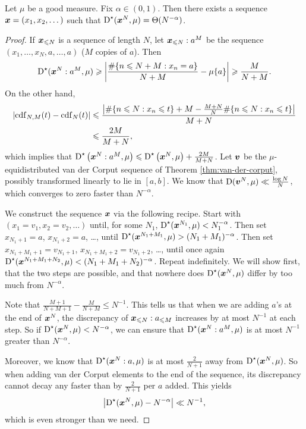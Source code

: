 \begin{theorem}\label{thm:discrepancy-arbitrary}
Let $\mu$ be a good measure. Fix $\alpha\in (0,1)$. Then there exists a 
sequence ${\boldsymbol x}=(x_1,x_2,\dots)$ such that 
$\operatorname{D}^\star({\boldsymbol x}^N,\mu) = \Theta(N^{-\alpha})$. 
\end{theorem}
\begin{proof}
If ${\boldsymbol x}_{\leqslant N}$ is a sequence of length $N$, let 
${\boldsymbol x}_{\leqslant N}:a^M$ be the sequence $(x_1,\dots,x_N,a,\dots,a)$ ($M$ copies 
of $a$). Then 
\[
	\operatorname{D}^\star({\boldsymbol x}^N:a^M,\mu)
		\geqslant \left| \frac{\#\{ n\leqslant N+M : x_n = a\}}{N+M} - \mu\{a\}\right| 
		\geqslant \frac{M}{N+M} .
\]
On the other hand, 
\begin{align*}
	\left| \operatorname{cdf}_{N,M}(t) - \operatorname{cdf}_N(t)\right| 
		&\leqslant \frac{\left|\#\{n\leqslant N : x_n\leqslant t\} + M - \frac{M+N}{N}\#\{n\leqslant N : x_n\leqslant t\}\right|}{M+N} \\
		&\leqslant \frac{2M}{M+N} ,
\end{align*}
which implies that 
$\operatorname{D}^\star\left({\boldsymbol x}^N:a^M,\mu\right) \leqslant \operatorname{D}^\star\left({\boldsymbol x}^N,\mu\right) + \frac{2 M}{M+N}$. 
Let ${\boldsymbol v}$ be the $\mu$-equidistributed van der Corput sequence of 
Theorem \ref{thm:van-der-corput}, possibly transformed linearly to lie in 
$[a,b]$. We know that $\operatorname{D}({\boldsymbol v}^N, \mu) \ll \frac{\log N}{N}$, which converges 
to zero faster than $N^{-\alpha}$. 

We construct the sequence ${\boldsymbol x}$ via the following recipe. Start with 
$(x_1 = v_1,x_2 = v_2,\dots)$ until, for some $N_1$, 
$\operatorname{D}^\star({\boldsymbol x}^{N_1},\mu) < N_1^{-\alpha}$. Then set $x_{N_1+1} = a$, 
$x_{N_1+2} = a$, \dots, until 
$\operatorname{D}^\star({\boldsymbol x}^{N_1+M_1},\mu) > (N_1+M_1)^{-\alpha}$. Then set 
$x_{N_1+M_1+1} = v_{N_1+1}$, $x_{N_1+M_1+2} = v_{N_1+2}$, \dots, 
until once again 
$\operatorname{D}^\star({\boldsymbol x}^{N_1+M_1+N_2},\mu) < (N_1+M_1+N_2)^{-\alpha}$. Repeat 
indefinitely. We will show first, that the two steps are possible, and that 
nowhere does $\operatorname{D}^\star({\boldsymbol x}^N,\mu)$ differ by too much from 
$N^{-\alpha}$. 

Note that $\frac{M+1}{N+M+1} - \frac{M}{N+M} \leqslant N^{-1}$. This tells 
us that when we are adding $a$'s at the end of ${\boldsymbol x}^N$, the discrepancy of 
${\boldsymbol x}_{\leqslant N}:a_{\leqslant M}$ increases by at most $N^{-1}$ at each 
step. So if $\operatorname{D}^\star({\boldsymbol x}^N,\mu) < N^{-\alpha}$, we can ensure that 
$\operatorname{D}^\star({\boldsymbol x}^N:a^M,\mu)$ is at most $N^{-1}$ greater than $N^{-\alpha}$. 

Moreover, we know that $\operatorname{D}^\star({\boldsymbol x}^N:a,\mu)$ is at most 
$\frac{2}{N+1}$ away from $\operatorname{D}^\star({\boldsymbol x}^N,\mu)$. So when adding van der 
Corput elements to the end of the sequence, its discrepancy cannot decay any 
faster than by $\frac{2}{N+1}$ per $a$ added. This yields 
\[
	\left|\operatorname{D}^\star({\boldsymbol x}^N,\mu) - N^{-\alpha}\right| \ll N^{-1} , 
\]
which is even stronger than we need.
\end{proof}

